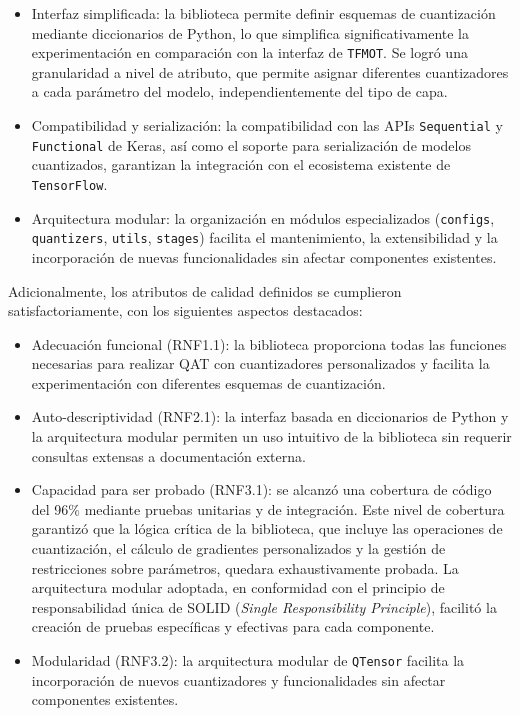 \begin{itemize}
    \item Interfaz simplificada: la biblioteca permite definir esquemas de cuantización mediante diccionarios de Python, lo que simplifica significativamente la experimentación en comparación con la interfaz de \texttt{TFMOT}. Se logró una granularidad a nivel de atributo, que permite asignar diferentes cuantizadores a cada parámetro del modelo, independientemente del tipo de capa.

    \item Compatibilidad y serialización: la compatibilidad con las APIs \texttt{Sequential} y \texttt{Functional} de Keras, así como el soporte para serialización de modelos cuantizados, garantizan la integración con el ecosistema existente de \texttt{TensorFlow}.

    \item Arquitectura modular: la organización en módulos especializados (\texttt{configs}, \texttt{quantizers}, \texttt{utils}, \texttt{stages}) facilita el mantenimiento, la extensibilidad y la incorporación de nuevas funcionalidades sin afectar componentes existentes.
\end{itemize}

Adicionalmente, los atributos de calidad definidos se cumplieron satisfactoriamente, con los siguientes aspectos destacados:

\begin{itemize}
    \item Adecuación funcional (RNF1.1): la biblioteca proporciona todas las funciones necesarias para realizar QAT con cuantizadores personalizados y facilita la experimentación con diferentes esquemas de cuantización.
    \item Auto-descriptividad (RNF2.1): la interfaz basada en diccionarios de Python y la arquitectura modular permiten un uso intuitivo de la biblioteca sin requerir consultas extensas a documentación externa.
    \item Capacidad para ser probado (RNF3.1): se alcanzó una cobertura de código del 96\% mediante pruebas unitarias y de integración. Este nivel de cobertura garantizó que la lógica crítica de la biblioteca, que incluye las operaciones de cuantización, el cálculo de gradientes personalizados y la gestión de restricciones sobre parámetros, quedara exhaustivamente probada. La arquitectura modular adoptada, en conformidad con el principio de responsabilidad única de SOLID \cite{ampatzoglou2019srp} (\textit{Single Responsibility Principle}), facilitó la creación de pruebas específicas y efectivas para cada componente.
    \item Modularidad (RNF3.2): la arquitectura modular de \texttt{QTensor} facilita la incorporación de nuevos cuantizadores y funcionalidades sin afectar componentes existentes.
\end{itemize}

